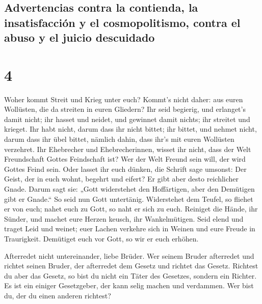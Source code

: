 \hypertarget{advertencias-contra-la-contienda-la-insatisfacciuxf3n-y-el-cosmopolitismo-contra-el-abuso-y-el-juicio-descuidado}{%
\subsection{Advertencias contra la contienda, la insatisfacción y el
cosmopolitismo, contra el abuso y el juicio
descuidado}\label{advertencias-contra-la-contienda-la-insatisfacciuxf3n-y-el-cosmopolitismo-contra-el-abuso-y-el-juicio-descuidado}}

\hypertarget{section-3}{%
\section{4}\label{section-3}}

 Woher kommt Streit und Krieg unter euch? Kommt's nicht
daher: aus euren Wollüsten, die da streiten in euren Gliedern?
 Ihr seid begierig, und erlanget's damit nicht; ihr hasset
und neidet, und gewinnet damit nichts; ihr streitet und krieget. Ihr
habt nicht, darum dass ihr nicht bittet;  ihr bittet, und
nehmet nicht, darum dass ihr übel bittet, nämlich dahin, dass ihr's mit
euren Wollüsten verzehret.  Ihr Ehebrecher und
Ehebrecherinnen, wisset ihr nicht, dass der Welt Freundschaft Gottes
Feindschaft ist? Wer der Welt Freund sein will, der wird Gottes Feind
sein.  Oder lasset ihr euch dünken, die Schrift sage
umsonst: Der Geist, der in euch wohnt, begehrt und eifert?
 Er gibt aber desto reichlicher Gnade. Darum sagt sie:
„Gott widerstehet den Hoffärtigen, aber den Demütigen gibt er Gnade.``
 So seid nun Gott untertänig. Widerstehet dem Teufel, so
fliehet er von euch;  nahet euch zu Gott, so naht er sich
zu euch. Reiniget die Hände, ihr Sünder, und machet eure Herzen keusch,
ihr Wankelmütigen.  Seid elend und traget Leid und weinet;
euer Lachen verkehre sich in Weinen und eure Freude in Traurigkeit.
 Demütiget euch vor Gott, so wir er euch erhöhen.

 Afterredet nicht untereinander, liebe Brüder. Wer seinem
Bruder afterredet und richtet seinen Bruder, der afterredet dem Gesetz
und richtet das Gesetz. Richtest du aber das Gesetz, so bist du nicht
ein Täter des Gesetzes, sondern ein Richter.  Es ist ein
einiger Gesetzgeber, der kann selig machen und verdammen. Wer bist du,
der du einen anderen richtest?

